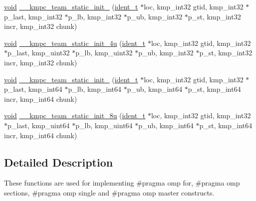 \begin{DoxyCompactItemize}
\item 
\hyperlink{ittnotify__static_8h_af941d56e55e3c5465135b60c4d6343ed}{void} \hyperlink{group__WORK__SHARING_gac43752941984fb8fda7dc8f2a430f4cb}{\-\_\-\-\_\-kmpc\-\_\-team\-\_\-static\-\_\-init\-\_} (\hyperlink{group__BASIC__TYPES_ga690fda6b92f039a72db263c6b4394ddb}{ident\-\_\-t} $\ast$loc, kmp\-\_\-int32 gtid, kmp\-\_\-int32 $\ast$p\-\_\-last, kmp\-\_\-int32 $\ast$p\-\_\-lb, kmp\-\_\-int32 $\ast$p\-\_\-ub, kmp\-\_\-int32 $\ast$p\-\_\-st, kmp\-\_\-int32 incr, kmp\-\_\-int32 chunk)
\item 
\hyperlink{ittnotify__static_8h_af941d56e55e3c5465135b60c4d6343ed}{void} \hyperlink{group__WORK__SHARING_ga99c820d33a0515e359a8f3414d3e9392}{\-\_\-\-\_\-kmpc\-\_\-team\-\_\-static\-\_\-init\-\_\-4u} (\hyperlink{group__BASIC__TYPES_ga690fda6b92f039a72db263c6b4394ddb}{ident\-\_\-t} $\ast$loc, kmp\-\_\-int32 gtid, kmp\-\_\-int32 $\ast$p\-\_\-last, kmp\-\_\-uint32 $\ast$p\-\_\-lb, kmp\-\_\-uint32 $\ast$p\-\_\-ub, kmp\-\_\-int32 $\ast$p\-\_\-st, kmp\-\_\-int32 incr, kmp\-\_\-int32 chunk)
\item 
\hyperlink{ittnotify__static_8h_af941d56e55e3c5465135b60c4d6343ed}{void} \hyperlink{group__WORK__SHARING_ga5d02abafbc1bf1f9c8d7f3d44ad85970}{\-\_\-\-\_\-kmpc\-\_\-team\-\_\-static\-\_\-init\-\_} (\hyperlink{group__BASIC__TYPES_ga690fda6b92f039a72db263c6b4394ddb}{ident\-\_\-t} $\ast$loc, kmp\-\_\-int32 gtid, kmp\-\_\-int32 $\ast$p\-\_\-last, kmp\-\_\-int64 $\ast$p\-\_\-lb, kmp\-\_\-int64 $\ast$p\-\_\-ub, kmp\-\_\-int64 $\ast$p\-\_\-st, kmp\-\_\-int64 incr, kmp\-\_\-int64 chunk)
\item 
\hyperlink{ittnotify__static_8h_af941d56e55e3c5465135b60c4d6343ed}{void} \hyperlink{group__WORK__SHARING_ga81091e3b6b3dfe02aab5e0a661f65433}{\-\_\-\-\_\-kmpc\-\_\-team\-\_\-static\-\_\-init\-\_\-8u} (\hyperlink{group__BASIC__TYPES_ga690fda6b92f039a72db263c6b4394ddb}{ident\-\_\-t} $\ast$loc, kmp\-\_\-int32 gtid, kmp\-\_\-int32 $\ast$p\-\_\-last, kmp\-\_\-uint64 $\ast$p\-\_\-lb, kmp\-\_\-uint64 $\ast$p\-\_\-ub, kmp\-\_\-int64 $\ast$p\-\_\-st, kmp\-\_\-int64 incr, kmp\-\_\-int64 chunk)
\end{DoxyCompactItemize}


\subsection{Detailed Description}
These functions are used for implementing {\ttfamily \#pragma omp for}, {\ttfamily \#pragma omp sections}, {\ttfamily \#pragma omp single} and {\ttfamily \#pragma omp master} constructs.

